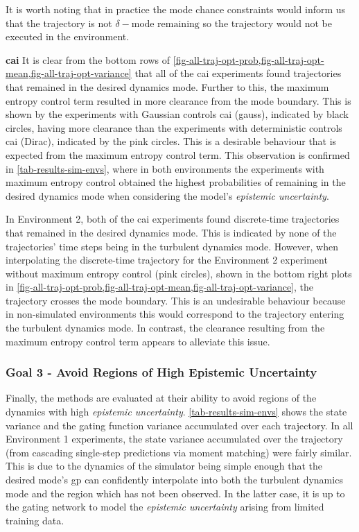 \documentclass{mimosis-class/mimosis}
\numberwithin{equation}{chapter}
\begin{document}
{It is worth noting that in practice the mode chance constraints would inform us that the trajectory
is not \(\delta-\text{mode remaining}\) so the trajectory would not be executed in the environment.


\newline

\textbf{\acrfull{cai}}
It is clear from the bottom rows of
\cref{fig-all-traj-opt-prob,fig-all-traj-opt-mean,fig-all-traj-opt-variance}
that all of the \acrshort{cai} experiments found trajectories that remained in the desired dynamics mode.
Further to this,
the maximum entropy control term resulted in more clearance from the mode boundary.
This is shown by the experiments with Gaussian controls \acrshort{cai} (gauss), indicated by black circles,
having more clearance than the experiments with deterministic controls \acrshort{cai} (Dirac), indicated by the pink circles.
This is a desirable behaviour that is expected from the maximum entropy control term.
This observation is confirmed in \cref{tab-results-sim-envs}, where in both environments the
experiments with maximum entropy
control obtained the highest probabilities of remaining in the desired dynamics mode when considering the
model's \emph{epistemic uncertainty}.

In Environment 2, both of the \acrshort{cai} experiments
found discrete-time trajectories that remained in the desired dynamics mode.
This is indicated by none of the trajectories' time steps being in the turbulent dynamics mode.
However, when interpolating the discrete-time trajectory for the Environment 2 experiment without
maximum entropy control (pink circles), shown in the bottom right plots in
\cref{fig-all-traj-opt-prob,fig-all-traj-opt-mean,fig-all-traj-opt-variance},
the trajectory crosses the mode boundary.
This is an undesirable behaviour because in non-simulated environments this would correspond to the trajectory
entering the turbulent dynamics mode.
In contrast, the clearance resulting from the maximum entropy control term appears to alleviate this issue.

\subsubsection{Goal 3 - Avoid Regions of High Epistemic Uncertainty}
\label{sec:org0546df4}
Finally, the methods are evaluated at their ability to avoid regions of the dynamics with high \emph{epistemic uncertainty}.
\cref{tab-results-sim-envs} shows the state variance and the gating function variance accumulated over
each trajectory.
In all Environment 1 experiments,
the state variance accumulated over the trajectory (from cascading single-step predictions via moment matching)
were fairly similar.
This is due to the dynamics of the simulator being simple enough that the desired mode's \acrshort{gp}
can confidently interpolate into both the turbulent dynamics mode and the region which has not been observed.
In the latter case, it is up to the gating network to model the \emph{epistemic uncertainty} arising from limited
training data.

}
\end{document}
